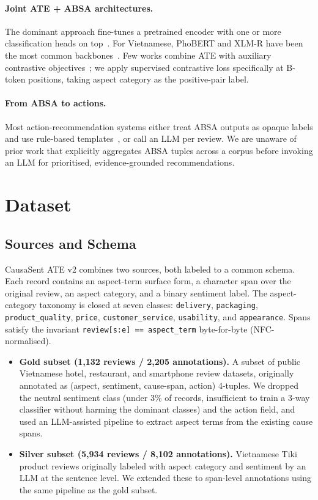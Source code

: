 \documentclass[conference]{IEEEtran}
\begin{document}
\paragraph{Joint ATE + ABSA architectures.} The dominant approach
fine-tunes a pretrained encoder with one or more classification heads
on top~\cite{xu2019bert,li2019unified}. For Vietnamese, PhoBERT and
XLM-R have been the most common backbones~\cite{nguyen2020phobert}.
Few works combine ATE with auxiliary contrastive
objectives~\cite{khosla2020supervised}; we apply supervised contrastive
loss specifically at B-token positions, taking aspect category as the
positive-pair label.

\paragraph{From ABSA to actions.} Most action-recommendation systems
either treat ABSA outputs as opaque labels and use rule-based
templates~\cite{li2020aspect}, or call an LLM per review. We are
unaware of prior work that explicitly aggregates ABSA tuples across a
corpus before invoking an LLM for prioritised, evidence-grounded
recommendations.

\section{Dataset}\label{sec:dataset}

\subsection{Sources and Schema}

CausaSent ATE v2 combines two sources, both labeled to a common schema.
Each record contains an aspect-term surface form, a character span over
the original review, an aspect category, and a binary sentiment label.
The aspect-category taxonomy is closed at seven classes:
\texttt{delivery}, \texttt{packaging}, \texttt{product\_quality},
\texttt{price}, \texttt{customer\_service}, \texttt{usability}, and
\texttt{appearance}. Spans satisfy the invariant
\verb|review[s:e] == aspect_term| byte-for-byte (NFC-normalised).

\begin{itemize}
    \item \textbf{Gold subset (1{,}132 reviews / 2{,}205 annotations).}
    A subset of public Vietnamese hotel, restaurant, and smartphone
    review datasets, originally annotated as
    (aspect, sentiment, cause-span, action) 4-tuples. We dropped the
    neutral sentiment class (under 3\% of records, insufficient to train
    a 3-way classifier without harming the dominant classes) and the
    action field, and used an LLM-assisted pipeline to extract aspect
    terms from the existing cause spans.
    \item \textbf{Silver subset (5{,}934 reviews / 8{,}102 annotations).}
    Vietnamese Tiki product reviews originally labeled with aspect
    category and sentiment by an LLM at the sentence level. We extended
    these to span-level annotations using the same pipeline as the gold
    subset.
\end{itemize}
\end{document}

